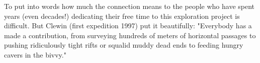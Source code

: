 

\newpage

To put into words how much the connection means to the people who have spent years (even decades!) dedicating their free time to this exploration project is difficult. But Clewin (first expedition 1997) put it beautifully: "Everybody has a made a contribution, from surveying hundreds of meters of horizontal passages to pushing ridiculously tight rifts or squalid muddy dead ends to feeding hungry cavers in the bivvy."



